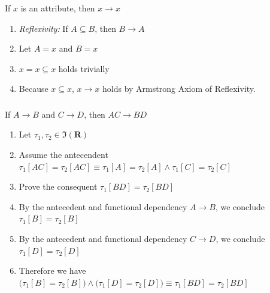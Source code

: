 \documentclass[letterpaper]{article}
\theoremstyle{plain}
\theoremstyle{definition}
\theoremstyle{remark}
\begin{document}
\subsubsection{}
\begin{center}
    If $x$ is an attribute, then $x\rightarrow x$
\end{center}
\begin{enumerate}
    \item \textit{Reflexivity:} If $A \subseteq B$, then $B \rightarrow A$
    \item Let $A = x$ and $B = x$
    \item $x = x \subseteq x$ holds trivially
    \item Because $x \subseteq x$, $x \rightarrow x$ holds by Armstrong Axiom of Reflexivity.
\end{enumerate}

\subsubsection{}
\begin{center}
    If $A \rightarrow B$ and $C \rightarrow D$, then $AC \rightarrow BD$
\end{center}
\begin{enumerate}
    \item Let $\tau_1,\tau_2\in\mathfrak{I}(\mathbf{R})$
    \item Assume the antecendent $\tau_1[AC]=\tau_2[AC]\equiv\tau_1[A]=\tau_2[A]\land\tau_1[C]=\tau_2[C]$
    \item Prove the consequent $\tau_1[BD]=\tau_2[BD]$
    \item By the antecedent and functional dependency $A\rightarrow B$, we conclude $\tau_1[B]=\tau_2[B]$
    \item By the antecedent and functional dependency $C\rightarrow D$, we conclude $\tau_1[D]=\tau_2[D]$
    \item Therefore we have $\big(\tau_1[B]=\tau_2[B]\big)\land\big(\tau_1[D]=\tau_2[D]\big)\equiv\tau_1[BD]=\tau_2[BD]$
\end{enumerate}
\end{document}
